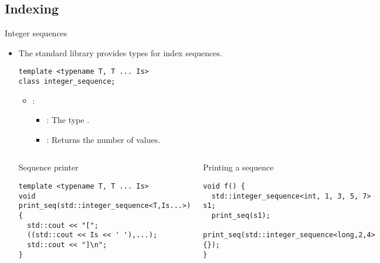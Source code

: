 \subsection{Indexing}

\begin{frame}[t,fragile]{Integer sequences}
\begin{itemize}
  \item The standard library provides types for index sequences.
\begin{lstlisting}
template <typename T, T ... Is>
class integer_sequence;
\end{lstlisting}
    \begin{itemize}
      \item {}:
        \begin{itemize}
          \item {}: The type .
          \item {}: Returns the number of values.
        \end{itemize}
    \end{itemize}

\begin{columns}[T]

\begin{block}{Sequence printer}
\begin{lstlisting}
template <typename T, T ... Is>
void print_seq(std::integer_sequence<T,Is...>) {
  std::cout << "[";
  ((std::cout << Is << ' '),...);
  std::cout << "]\n";
}
\end{lstlisting}
\end{block}

\begin{block}{Printing a sequence}
\begin{lstlisting}
void f() {
  std::integer_sequence<int, 1, 3, 5, 7> s1;
  print_seq(s1);
  print_seq(std::integer_sequence<long,2,4>{});
}
\end{lstlisting}
\end{block}
\end{columns}

\end{itemize}
\end{frame}

